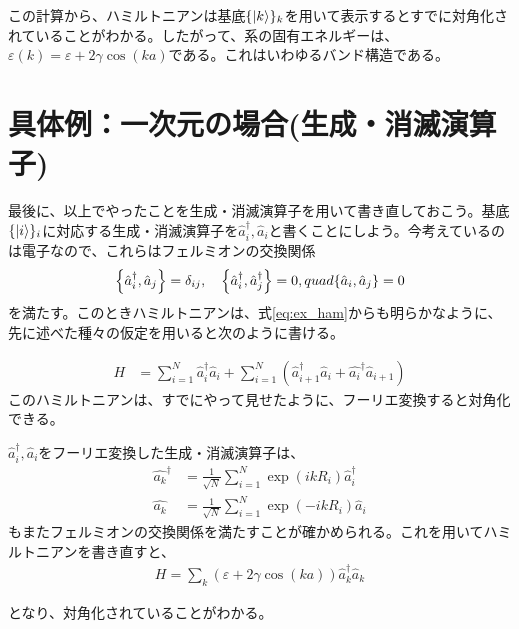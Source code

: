 \documentclass[uplatex,dvipdfmx]{jsarticle}
\newcommand{\crt}[1]{\hat{#1}^\dagger}
\newcommand{\anh}[1]{\hat{#1}}
\begin{document}
    この計算から、ハミルトニアンは基底$\{\ket{k}\}_{k}$を用いて表示するとすでに対角化されていることがわかる。したがって、系の固有エネルギーは、$\varepsilon(k) = \varepsilon + 2\gamma \cos(ka)$である。これはいわゆるバンド構造である。

    \section{具体例：一次元の場合(生成・消滅演算子)}
    最後に、以上でやったことを生成・消滅演算子を用いて書き直しておこう。基底$\{\ket{i}\}_{i}$に対応する生成・消滅演算子を$\crt{a}_i, \anh{a}_i$と書くことにしよう。今考えているのは電子なので、これらはフェルミオンの交換関係
    \begin{align}
        \acomm{\crt{a}_i}{\anh{a}_j} = \delta_{ij}, \quad 
        \acomm{\crt{a}_i}{\crt{a}_j} = 0 , quad \acomm{\anh{a}_i}{\anh{a}_j} = 0        
    \end{align}
    を満たす。このときハミルトニアンは、式\ref{eq:ex_ham}からも明らかなように、先に述べた種々の仮定を用いると次のように書ける。
    
    \begin{align}
        H &= \sum_{i=1}^N \crt{a}_i\anh{a}_i + \sum_{i=1}^N \left(\crt{a}_{i+1}\anh{a}_{i} + \crt{a_{i}}\anh{a}_{i+1} \right)
    \end{align}
    このハミルトニアンは、すでにやって見せたように、フーリエ変換すると対角化できる。

    $\crt{a}_i, \anh{a}_i$をフーリエ変換した生成・消滅演算子は、
    \begin{align}
        \crt{a_k} &= \frac{1}{\sqrt{N}} \sum_{i=1}^N \exp(ikR_i)\crt{a}_i \\
        \anh{a_k} &= \frac{1}{\sqrt{N}} \sum_{i=1}^N \exp(-ikR_i)\anh{a}_i        
    \end{align}
    もまたフェルミオンの交換関係を満たすことが確かめられる。これを用いてハミルトニアンを書き直すと、
    \begin{align}
        H = \sum_k \left(\varepsilon+2\gamma \cos(ka) \right)\crt{a}_k \anh{a}_k
    \end{align}

    となり、対角化されていることがわかる。
\end{document}
